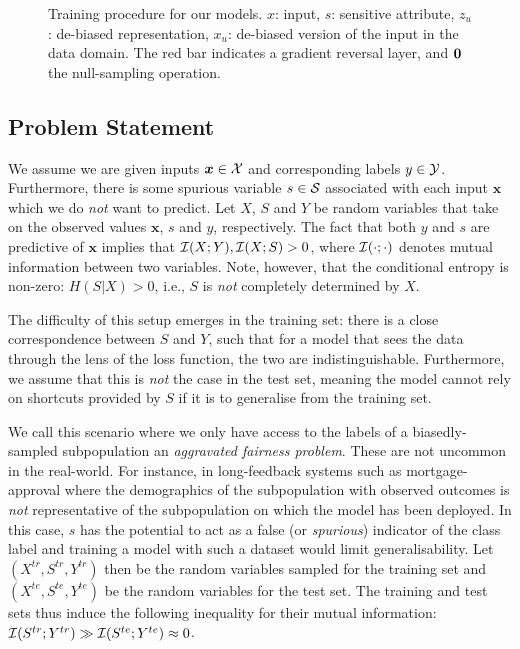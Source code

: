 \begin{figure}[tb]
{        \label{fig:cvae_diagram}
    }
    \hfill
    \caption{
        Training procedure for our models. $x$: input, $s$: sensitive attribute, $z_u$: de-biased
        representation, $x_u$: de-biased version of the input in the data domain. The red bar
        indicates a gradient reversal layer, and ${\bm{0}}$ the null-sampling operation.
    }%
    \label{fig:model-diagrams}
\end{figure}

\subsection{Problem Statement}
%
\noindent We assume we are given inputs $\bm{x} \in {\mathcal{X}}$ and corresponding labels $y \in {\mathcal{Y}}$.
Furthermore, there is some spurious variable $s \in {\mathcal{S}}$ associated with each input $\bm{x}$ which
we do \emph{not} want to predict. 
%
Let $X$, $S$ and $Y$ be random variables that take on the observed values $\bm{x}$, $s$ and $y$,
respectively. 
%
The fact that both $y$ and $s$ are predictive of $\bm{x}$ implies that ${\mathcal{I}}(X;Y), {\mathcal{I}}(X;S) > 0$,
where ${\mathcal{I}}(\cdot ;\cdot)$ denotes mutual information between two variables.
%
Note, however, that the conditional entropy is non-zero: $H(S|X) > 0$, i.e., $S$ is \emph{not}
completely determined by $X$.

The difficulty of this setup emerges in the training set: there is a close correspondence between
$S$ and $Y$, such that for a model that sees the data through the lens of the loss function, the
two are indistinguishable. 
%
Furthermore, we assume that this is \emph{not} the case in the test set, meaning the model cannot
rely on shortcuts provided by $S$ if it is to generalise from the training set.

We call this scenario where we only have access to the labels of a biasedly-sampled subpopulation
an \emph{aggravated fairness problem}. 
%
These are not uncommon in the real-world. 
%
For instance, in long-feedback systems such as mortgage-approval where the demographics of the
subpopulation with observed outcomes is \emph{not} representative of the subpopulation on which the
model has been deployed. 
%
In this case, $s$ has the potential to act as a false (or \emph{spurious}) indicator of the class
label and training a model with such a dataset would limit generalisability. 
%
Let $(X^{tr}, S^{tr}, Y^{tr})$ then be the random variables sampled for the training set and
$(X^{te}, S^{te}, Y^{te})$ be the random variables for the test set. 
%
The training and test sets thus induce the following inequality for their mutual information:
${\mathcal{I}}(S^{tr}; Y^{tr}) \gg {\mathcal{I}}(S^{te}; Y^{te}) \approx 0$.

